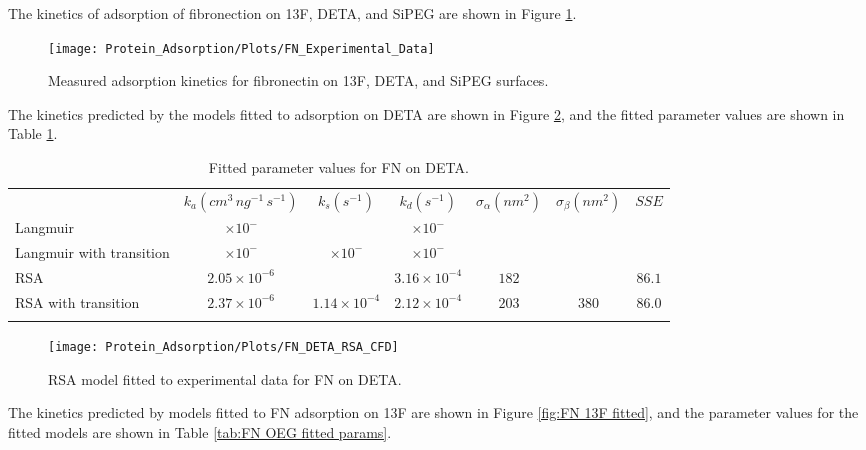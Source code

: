 The kinetics of adsorption of fibronection on 13F, DETA, and SiPEG
are shown in Figure \ref{fig:FN experiments}.%
\begin{figure}
\texttt{[image: Protein\_Adsorption/Plots/FN\_Experimental\_Data]}

\caption{\label{fig:FN experiments}Measured adsorption kinetics for fibronectin
on 13F, DETA, and SiPEG surfaces.}


%
\end{figure}
 The kinetics predicted by the models fitted to adsorption on DETA
are shown in Figure \ref{fig:FN DETA fitted}, and the fitted parameter
values are shown in Table \ref{tab:FN on DETA params}.%
\begin{table}
\caption{\label{tab:FN on DETA params}Fitted parameter values for FN on DETA.}
\begin{tabular}{>{\raggedright}p{0.75in}cccccc}
 & $k_{a}\left(cm^{3}\, ng^{-1}\, s^{-1}\right)$ & $k_{s}\left(s^{-1}\right)$ & $k_{d}\left(s^{-1}\right)$ & $\sigma_{\alpha}\left(nm^{2}\right)$ & $\sigma_{\beta}\left(nm^{2}\right)$ & $SSE$\tabularnewline[\doublerulesep]
\cline{2-7} 
\noalign{\vskip\doublerulesep}
Langmuir & $\times10^{-}$ &  & $\times10^{-}$ & $ $ &  & $ $\tabularnewline
Langmuir with transition & $\times10^{-}$ & $\times10^{-}$ & $\times10^{-}$ & $ $ & $ $ & $ $\tabularnewline
\noalign{\vskip\doublerulesep}
RSA & $2.05\times10^{-6}$ &  & $3.16\times10^{-4}$ & $182$ &  & $86.1$\tabularnewline
\noalign{\vskip\doublerulesep}
RSA with transition & $2.37\times10^{-6}$ & $1.14\times10^{-4}$ & $2.12\times10^{-4}$ & $203$ & $380$ & $86.0$\tabularnewline
\noalign{\vskip\doublerulesep}
\end{tabular}%
\end{table}
%
\begin{figure}
\texttt{[image: Protein\_Adsorption/Plots/FN\_DETA\_RSA\_CFD]}

\caption{\label{fig:FN DETA fitted}RSA model fitted to experimental data for
FN on DETA.}


%
\end{figure}
 The kinetics predicted by models fitted to FN adsorption on 13F are
shown in Figure \ref{fig:FN 13F fitted}, and the parameter values
for the fitted models are shown in Table \ref{tab:FN OEG fitted params}.%
